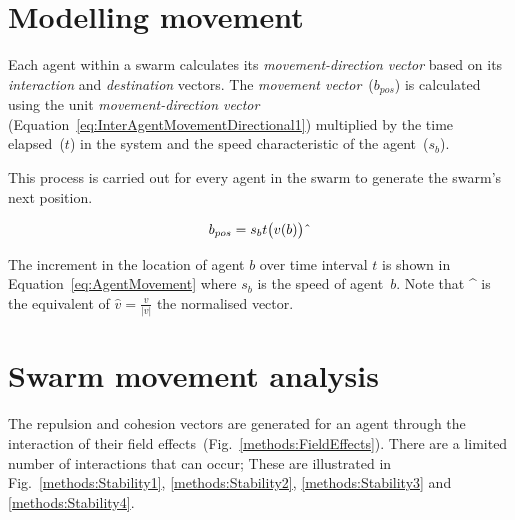 \documentclass{ieeeaccess}
\begin{document}

\section{Modelling movement}\label{Section::Movement1}
Each agent within a swarm calculates its \textit{movement-direction vector} based on its \textit{interaction} and \textit{destination} vectors. The \textit{movement vector}~($b_{pos}$) is calculated using the unit \textit{movement-direction vector} (Equation~\ref{eq:InterAgentMovementDirectional1}) multiplied by the time elapsed~($t$) in the system and the speed characteristic of the agent~($s_b$).

This process is carried out for every agent in the swarm to generate the swarm's next position.

\begin{center}
\begin{equation}
\label{eq:AgentMovement}
b_{pos}=s_{b}t\big(v(b)\big)\string^ 
\end{equation}
\end{center}

The increment in the location of agent $b$ over time interval $t$ is shown in Equation~\ref{eq:AgentMovement} where $s_b$ is the speed of agent~$b$. Note that \string^ is the equivalent of $\hat{v} = \frac{v}{|v|}$ the normalised vector.

\section{Swarm movement analysis\label{metric:MagnitudeDynamics2}}
The repulsion and cohesion vectors are generated for an agent through the interaction of their field effects~(Fig.~\ref{methods:FieldEffects}). There are a limited number of interactions that can occur; These are illustrated in Fig.~\ref{methods:Stability1}, \ref{methods:Stability2}, \ref{methods:Stability3} and \ref{methods:Stability4}.
\end{document}
